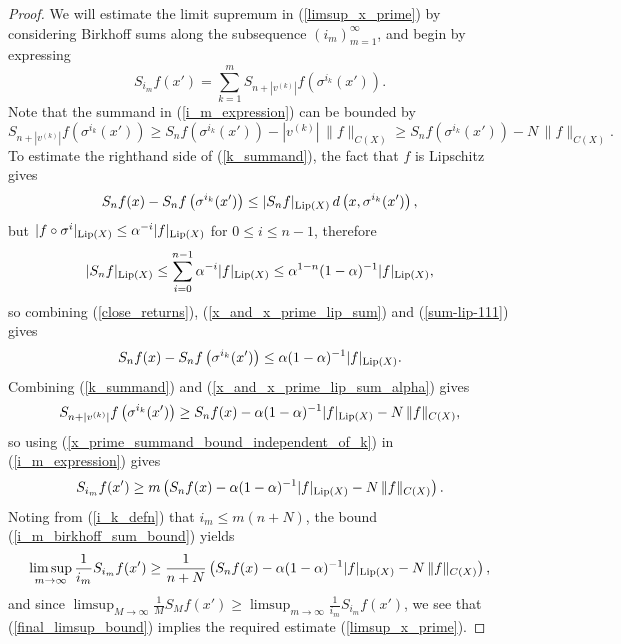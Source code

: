 \documentclass[reqno,11pt]{amsart}
\theoremstyle{definition}
\theoremstyle{remark}
\theoremstyle{remark}
\def\lip{{\rm Lip}}
\numberwithin{equation}{section}
\begin{document}
\begin{proof}
We will estimate the limit supremum in (\ref{limsup_x_prime}) by considering 
Birkhoff sums along the subsequence $(i_m)_{m=1}^\infty$,
and begin by expressing
\begin{equation}\label{i_m_expression}
S_{i_m}f(x') = \sum_{k=1}^m S_{n+|v^{(k)}|}f \left(\sigma^{i_k}(x')\right).
\end{equation}
Note that the summand in (\ref{i_m_expression}) can be bounded by
\begin{equation}\label{k_summand}
 S_{n+|v^{(k)}|}f \left(\sigma^{i_k}(x')\right)
\ge
S_{n}f \left(\sigma^{i_k}(x')\right) -  |v^{(k)}| \,  \|f\|_{C(X)}
\ge
S_{n}f \left(\sigma^{i_k}(x')\right) -  N \,  \|f\|_{C(X)} .
\end{equation}
To estimate the righthand side of (\ref{k_summand}),
the fact that $f$ is Lipschitz gives 
\begin{equation}\label{x_and_x_prime_lip_sum}
S_nf(x)-S_nf\left(\sigma^{i_k}(x')\right)
\le |S_nf|_{\lip(X)} \,  d\left(x, \sigma^{i_k}(x')\right),
\end{equation}
but
$|f\circ \sigma^i |_{\lip(X)}\le \alpha^{-i}|f|_{\lip(X)}$ for $0\le i\le n-1$, therefore
\begin{equation}\label{sum-lip-111}
|S_nf|_{\lip(X)}\le \sum_{i=0}^{n-1} \alpha^{-i} |f|_{\lip(X)}\le \alpha^{1-n}(1-\alpha)^{-1}|f|_{\lip(X)},
\end{equation}
so combining (\ref{close_returns}), (\ref{x_and_x_prime_lip_sum}) 
and (\ref{sum-lip-111}) gives
\begin{equation}\label{x_and_x_prime_lip_sum_alpha}
S_nf(x)-S_nf\left(\sigma^{i_k}(x')\right)
\le \alpha(1-\alpha)^{-1} |f|_{\lip(X)}.
\end{equation}
Combining (\ref{k_summand}) and (\ref{x_and_x_prime_lip_sum_alpha}) gives
\begin{equation}\label{x_prime_summand_bound_independent_of_k}
S_{n+|v^{(k)}|}f \left(\sigma^{i_k}(x')\right) \ge S_nf(x) - \alpha(1-\alpha)^{-1} |f|_{\lip(X)}  - N\, \|f\|_{C(X)},
\end{equation}
so using (\ref{x_prime_summand_bound_independent_of_k}) in (\ref{i_m_expression}) gives
\begin{equation}\label{i_m_birkhoff_sum_bound}
S_{i_m}f(x')
\ge
m \left( S_nf(x) - \alpha(1-\alpha)^{-1} |f|_{\lip(X)}   - N\, \|f\|_{C(X)} \right).
\end{equation}
Noting from (\ref{i_k_defn}) that $i_m \le m(n+N)$, the bound (\ref{i_m_birkhoff_sum_bound}) yields
\begin{equation}\label{final_limsup_bound}
\limsup_{m\to\infty} \frac{1}{i_m} S_{i_m}f(x')
\ge \frac{1}{n+N} \left( S_nf(x) - \alpha(1-\alpha)^{-1} |f|_{\lip(X)}  - N\, \|f\|_{C(X)} \right),
\end{equation}
and since $\limsup_{M\to\infty} \frac{1}{M} S_Mf(x') \ge \limsup_{m\to\infty} \frac{1}{i_m} S_{i_m}f(x')$,
we see that (\ref{final_limsup_bound}) implies the required estimate  (\ref{limsup_x_prime}).
\end{proof}
\end{document}
